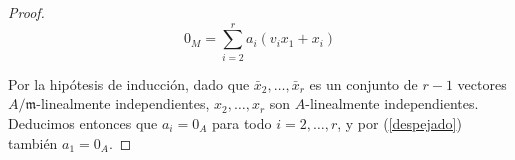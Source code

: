 \documentclass[../main.tex]{subfiles}
\begin{document}
\begin{proof}
$$
0_M = \sum_{i=2}^r a_i(v_ix_1+x_i)
$$

Por la hipótesis de inducción, dado que $\bar x_2, \dots, \bar x_r$ es un conjunto de $r-1$ vectores $A/\mathfrak{m}$-linealmente independientes, $ x_2, \dots, x_r$ son $A$-linealmente independientes. Deducimos entonces que $a_i=0_A$ para todo $i=2,\dots,r$, y por (\ref{despejado}) también $a_1 = 0_A$.

\end{proof}
\end{document}
